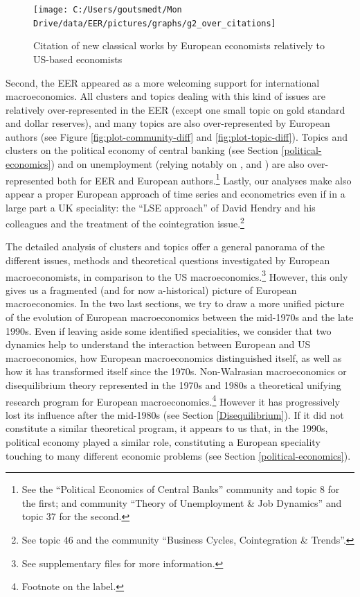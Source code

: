 \documentclass[]{elsarticle} %
\begin{document}
\begin{figure}[h]

{\centering \texttt{[image: C:/Users/goutsmedt/Mon Drive/data/EER/pictures/graphs/g2\_over\_citations]} 

}

\caption{Citation of new classical works by European economists relatively to US-based economists}\label{fig:plot-new-classical}
\end{figure}

Second, the EER appeared as a more welcoming support for international
macroeconomics. All clusters and topics dealing with this kind of issues
are relatively over-represented in the EER (except one small topic on
gold standard and dollar reserves), and many topics are also
over-represented by European authors (see Figure
\ref{fig:plot-community-diff} and \ref{fig:plot-topic-diff}). Topics and
clusters on the political economy of central banking (see Section
\ref{political-economics}) and on unemployment (relying notably on
\citet{pissarides1990}, \citet{mortensen1994} and \citet{layard1991a})
are also over-represented both for EER and European authors.\footnote{See
  the ``Political Economics of Central Banks'' community and topic 8 for
  the first; and community ``Theory of Unemployment \& Job Dynamics''
  and topic 37 for the second.} Lastly, our analyses make also appear a
proper European approach of time series and econometrics even if in a
large part a UK speciality: the ``LSE approach'' of David Hendry and his
colleagues \citep[chapter 4]{qin2013a} and the treatment of the
cointegration issue.\footnote{See topic 46 and the community ``Business
  Cycles, Cointegration \& Trends''.}

The detailed analysis of clusters and topics offer a general panorama of
the different issues, methods and theoretical questions investigated by
European macroeconomists, in comparison to the US
macroeconomics.\footnote{See supplementary files for more information.}
However, this only gives us a fragmented (and for now a-historical)
picture of European macroeconomics. In the two last sections, we try to
draw a more unified picture of the evolution of European macroeconomics
between the mid-1970s and the late 1990s. Even if leaving aside some
identified specialities, we consider that two dynamics help to
understand the interaction between European and US macroeconomics, how
European macroeconomics distinguished itself, as well as how it has
transformed itself since the 1970s. Non-Walrasian macroeconomics or
disequilibrium theory represented in the 1970s and 1980s a theoretical
unifying research program for European macroeconomics.\footnote{Footnote
  on the label.} However it has progressively lost its influence after
the mid-1980s (see Section \ref{Disequilibrium}). If it did not
constitute a similar theoretical program, it appears to us that, in the
1990s, political economy played a similar role, constituting a European
speciality touching to many different economic problems (see Section
\ref{political-economics}).
\end{document}
